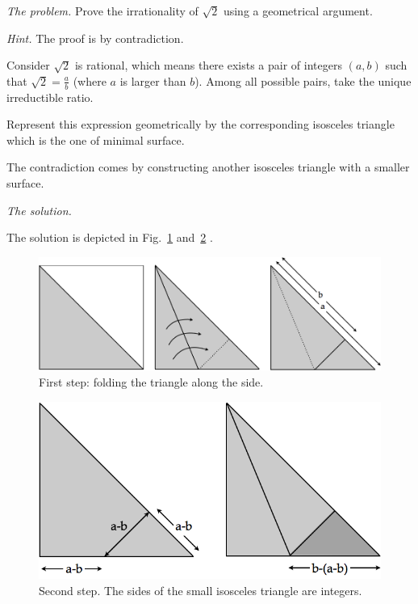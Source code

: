 \noindent \textit{The problem.}
Prove the irrationality of $\sqrt{2}$ using a geometrical argument.
\medskip

\noindent \textit{Hint.}
The proof is by contradiction. 

Consider $\sqrt{2}$ is rational, which means there exists a pair of integers $(a,b)$
such that $\sqrt{2} = \frac{a}{b}$ (where $a$ is larger than $b$).
Among all possible pairs, take the unique irreductible ratio.

Represent this expression geometrically by the corresponding isosceles triangle
which is the one of minimal surface. 

The contradiction comes by constructing another isosceles triangle with a smaller surface.
\medskip

\noindent \textit{The solution.}

The solution is depicted in Fig.~\ref{Fig:sqrtbisInit} and~\ref{Fig:sqrtbisFin} . 
\begin{figure}
\begin{center}
        \includegraphics[scale=0.3]{FiguresArithmetic/sqrtbisInit}
        \caption{First step: folding the triangle along the side.}
        \label{Fig:sqrtbisInit}
\end{center}
\end{figure}
\begin{figure}
\begin{center}
        \includegraphics[scale=0.3]{FiguresArithmetic/sqrtbisFin}
        \caption{Second step. The sides of the small isosceles triangle are integers.}
        \label{Fig:sqrtbisFin}
\end{center}
\end{figure}




